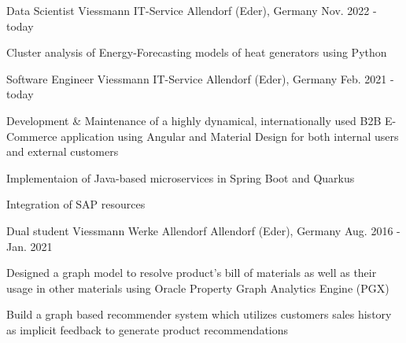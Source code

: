 

\begin{cventries}

  \cventry
    {Data Scientist} %
    {Viessmann IT-Service} %
    {Allendorf (Eder), Germany} %
    {Nov. 2022 - today} %
    {
      \begin{cvitems} %
        \item {Cluster analysis of Energy-Forecasting models of heat generators using Python}
      \end{cvitems}
    }
  \cventry
    {Software Engineer} %
    {Viessmann IT-Service} %
    {Allendorf (Eder), Germany} %
    {Feb. 2021 - today} %
    {
      \begin{cvitems} %
        \item {Development \& Maintenance of a highly dynamical, internationally used B2B E-Commerce application using Angular and Material Design for both internal users and external customers}
        \item {Implementaion of Java-based microservices in Spring Boot and Quarkus}
        \item {Integration of SAP resources}
      \end{cvitems}
    }

    \cventry
    {Dual student} %
    {Viessmann Werke Allendorf} %
    {Allendorf (Eder), Germany} %
    {Aug. 2016 - Jan. 2021} %
    {
        \begin{cvitems} %
            \item {Designed a graph model to resolve product's bill of materials as well as their usage in other materials using Oracle Property Graph Analytics Engine (PGX)}
            \item {Build a graph based recommender system which utilizes customers sales history as implicit feedback to generate product recommendations}
        \end{cvitems}
    }

\end{cventries}
